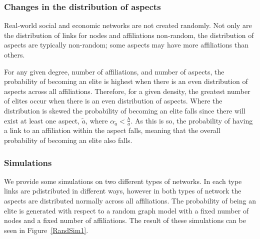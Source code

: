 \begin{subappendices}
\subsubsection*{Changes in the distribution of aspects}

Real-world social and economic networks are not created randomly. Not only are the distribution of links for nodes and affiliations non-random, the distribution of aspects are typically non-random; some aspects may have more affiliations than others.

For any given degree, number of affiliations, and number of aspects, the probability of becoming an elite is highest when there is an even distribution of aspects across all affiliations. Therefore, for a given density, the greatest number of elites occur when there is an even distribution of aspects. Where the distribution is skewed the probability of becoming an elite falls since there will exist at least one aspect, $\tilde{a}$, where $\alpha_{\tilde{a}} < \frac{h}{a}$. As this is so, the probability of having a link to an affiliation within the aspect falls, meaning that the overall probability of becoming an elite also falls.

\subsubsection*{Simulations}

We provide some simulations on two different types of networks. In each type links are pdistributed in different ways, however in both types of network the aspects are distributed normally across all affiliations. The probability of being an elite is generated with respect to a random graph model with a fixed number of nodes and a fixed number of affiliations. The result of these simulations can be seen in Figure~\ref{RandSim1}.


\end{subappendices}
